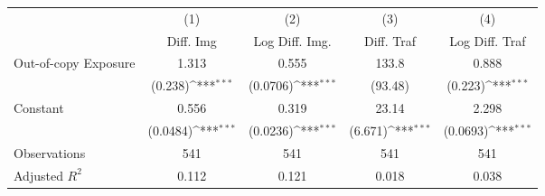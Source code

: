 {
\def\sym#1{\ifmmode^{#1}\else\(^{#1}\)\fi}
\begin{tabular*}{\hsize}{@{\hskip\tabcolsep\extracolsep\fill}l*{4}{c}}
\toprule
                    &\multicolumn{1}{c}{(1)}&\multicolumn{1}{c}{(2)}&\multicolumn{1}{c}{(3)}&\multicolumn{1}{c}{(4)}\\
                    &\multicolumn{1}{c}{Diff. Img}&\multicolumn{1}{c}{Log Diff. Img.}&\multicolumn{1}{c}{Diff. Traf}&\multicolumn{1}{c}{Log Diff. Traf}\\
\midrule
Out-of-copy Exposure&       1.313         &       0.555         &       133.8         &       0.888         \\
                    &     (0.238)\sym{***}&    (0.0706)\sym{***}&     (93.48)         &     (0.223)\sym{***}\\
\addlinespace
Constant            &       0.556         &       0.319         &       23.14         &       2.298         \\
                    &    (0.0484)\sym{***}&    (0.0236)\sym{***}&     (6.671)\sym{***}&    (0.0693)\sym{***}\\
\midrule
Observations        &         541         &         541         &         541         &         541         \\
Adjusted \(R^{2}\)  &       0.112         &       0.121         &       0.018         &       0.038         \\
\bottomrule
\end{tabular*}
}
